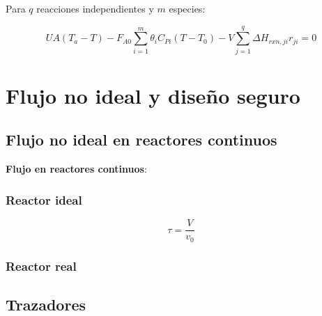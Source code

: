         Para \(q\) reacciones independientes y \(m\) especies:
        
        \begin{equation}
        \label{eq:proceso_no_adiabatico_cstr_rxn_multiples}
            UA \left (T_{a} - T \right ) - F_{A0} \sum_{i=1}^{m} \theta_{i} C_{Pi} \left ( T - T_{0} \right ) - V \sum_{j=1}^{q} \Delta H_{rxn, ji}r_{ji} = 0
        \end{equation}
        
\section{Flujo no ideal y diseño seguro}

    \subsection{Flujo no ideal en reactores continuos}
    
    \textbf{Flujo en reactores continuos}:
        
        \subsubsection{Reactor ideal}
                
        \begin{quote}
            \textit{}
        \end{quote}
        
        \[\tau = \frac{V}{v_{0}}\]
        
        \subsubsection{Reactor real}
        
        \begin{quote}
            \textit{}
        \end{quote}
        
    \subsection{Trazadores}
        
        \begin{quote}
            \textit{}
        \end{quote}
        
